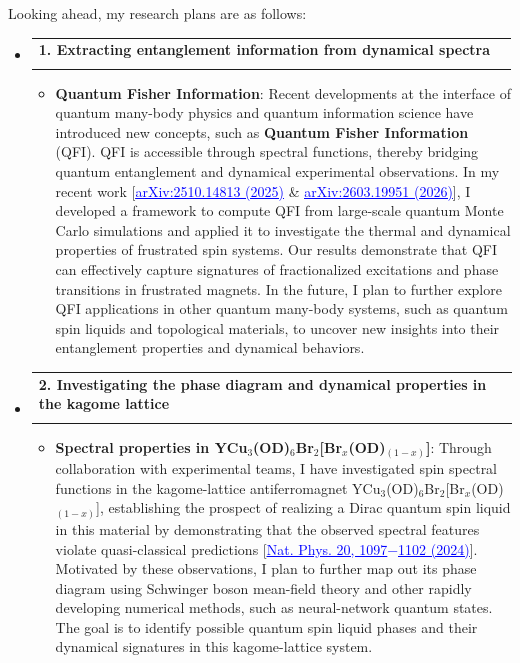 \documentclass[letterpaper,11pt]{article}
\makeatletter
\newcommand{\cvitem}[1]{
  \item\small{
    {#1\vspace{-5pt}}
  }
}
\newcommand{\cvheading}[4]{
  \vspace{-5pt}\item
    \begin{tabular*}{\textwidth}[t]{l@{\extracolsep{\fill}}r}
      \textbf{#1} & #2 \\
      \small#3 & \small #4 \\
    \end{tabular*}\vspace{-7pt}
}
\newcommand{\cvheadingstart}{\begin{itemize}[leftmargin=0in, label={}]}
\newcommand{\cvheadingend}{\end{itemize}}
\newcommand{\cvitemstart}{\begin{itemize}[label=\textopenbullet]\justifying}
\newcommand{\cvitemend}{\end{itemize}\vspace{-3pt}}
\makeatother
\begin{document}
\vspace{4pt}
Looking ahead, my research plans are as follows:
\cvheadingstart
  \cvheading
    {1. Extracting entanglement information from dynamical spectra}{}
    {}{}
  \vspace{-12pt}
  \cvitemstart
    \cvitem{\textbf{Quantum Fisher Information}: Recent developments at the interface of quantum many-body physics and quantum information science have introduced new concepts, such as \textbf{Quantum Fisher Information} (QFI). QFI is accessible through spectral functions, thereby bridging quantum entanglement and dynamical experimental observations. In my recent work [\href{https://arxiv.org/abs/2510.14813}{\textcolor{blue}{\underline{arXiv:2510.14813 (2025)}}} \& \href{https://arxiv.org/abs/2603.19951}{\textcolor{blue}{\underline{arXiv:2603.19951 (2026)}}}], I developed a framework to compute QFI from large-scale quantum Monte Carlo simulations and applied it to investigate the thermal and dynamical properties of frustrated spin systems. Our results demonstrate that QFI can effectively capture signatures of fractionalized excitations and phase transitions in frustrated magnets. In the future, I plan to further explore QFI applications in other quantum many-body systems, such as quantum spin liquids and topological materials, to uncover new insights into their entanglement properties and dynamical behaviors.}
  \cvitemend
  
  \vspace{5pt}
  
  \cvheading
    {2. Investigating the phase diagram and dynamical properties in the kagome lattice}{}
    {}{}
  \vspace{-12pt}
  \cvitemstart
    \cvitem{\textbf{Spectral properties in YCu$_3$(OD)$_6$Br$_2$[Br$_x$(OD)$_{(1-x)}$]}: Through collaboration with experimental teams, I have investigated spin spectral functions in the kagome-lattice antiferromagnet YCu$_3$(OD)$_6$Br$_2$[Br$_x$(OD)$_{(1-x)}$], establishing the prospect of realizing a Dirac quantum spin liquid in this material by demonstrating that the observed spectral features violate quasi-classical predictions [\href{https://doi.org/10.1038/s41567-024-02495-z}{\textcolor{blue}{\underline{Nat. Phys. 20, 1097$-$1102 (2024)}}}]. Motivated by these observations, I plan to further map out its phase diagram using Schwinger boson mean-field theory and other rapidly developing numerical methods, such as neural-network quantum states. The goal is to identify possible quantum spin liquid phases and their dynamical signatures in this kagome-lattice system.}
  \cvitemend
\cvheadingend

\endgroup
\end{document}
